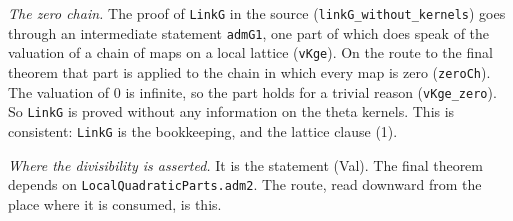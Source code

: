 \documentclass[11pt,letterpaper]{article}
\begin{document}
\emph{The zero chain.} The proof of \texttt{LinkG} in the source (\texttt{linkG\_without\_kernels}) goes
through an intermediate statement \texttt{admG1}, one part of which does speak of the valuation of a chain
of maps on a local lattice (\texttt{vKge}). On the route to the final theorem that part is applied to the
chain in which every map is zero (\texttt{zeroCh}). The valuation of $0$ is infinite, so the part holds
for a trivial reason (\texttt{vKge\_zero}). So \texttt{LinkG} is proved without any information on the
theta kernels. This is consistent: \texttt{LinkG} is the bookkeeping, and the lattice clause (1).

\emph{Where the divisibility is asserted.} It is the statement \textup{(Val)}. The final theorem depends
on \texttt{LocalQuadraticParts.adm2}. The route, read downward from the place where it is consumed, is
this.
\end{document}
